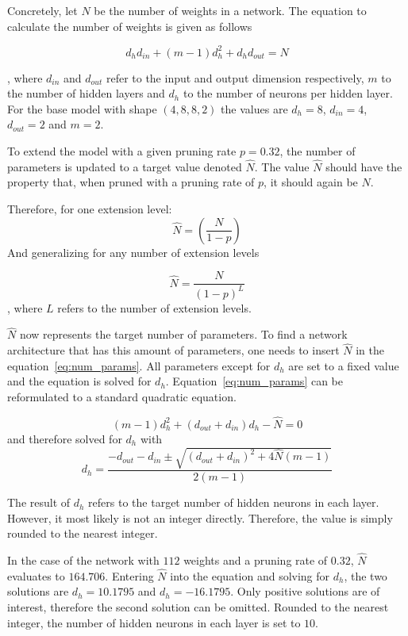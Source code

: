 Concretely, let $N$ be the number of weights in a network.
The equation to calculate the number of weights is given as follows

\begin{equation} \label{eq:num_params}
    d_h d_{in}+(m-1)d_h^2 + d_h d_{out} = N
\end{equation}

, where $d_{in}$ and $d_{out}$ refer to the input and output dimension respectively, $m$ to the number of hidden layers and
$d_h$ to the number of neurons per hidden layer.
For the base model with shape $(4, 8, 8, 2)$ the values are $d_h=8$, 
$d_{in}=4$, $d_{out}=2$ and $m=2$.
 
To extend the model with a given pruning rate $p=0.32$, the number of parameters is updated to a target value denoted $\hat N$.
The value $\hat N$ should have the property that, when pruned with a pruning rate of $p$, it should again be $N$.

Therefore, for one extension level:
\[
\hat N = {(\frac{N}{1-p})}
\]
And generalizing for any number of extension levels

\[
\hat N = {\frac{N}{{(1-p)}^L}}
\]
, where $L$ refers to the number of extension levels.

$\hat N$ now represents the target number of parameters. 
To find a network architecture that has this amount of parameters, one needs to insert $\hat N$ in the equation~\ref{eq:num_params}.
All parameters except for $d_h$ are set to a fixed value and the equation is solved for $d_h$.
Equation~\ref{eq:num_params} can be reformulated to a standard quadratic equation.

\[
    (m-1)d_h^2 + (d_{out} + d_{in}) d_h - \hat N = 0
\]
and therefore solved for $d_h$ with 
\[
    d_h = \frac{
        - d_{out} - d_{in} \pm \sqrt{  {(d_{out} + d_{in})}^2 + 4 \hat N (m-1) } 
    }{
        2(m-1)
    }
\]

The result of $d_h$ refers to the target number of hidden neurons in each layer.
However, it most likely is not an integer directly.
Therefore, the value is simply rounded to the nearest integer.

In the case of the network with $112$ weights and a pruning rate of $0.32$, $\hat N$ evaluates to $164.706$.
Entering $\hat N$ into the equation and solving for $d_h$, the two solutions are $d_h=10.1795$ and $d_h=-16.1795$.
Only positive solutions are of interest, therefore the second solution can be omitted.
Rounded to the nearest integer, the number of hidden neurons in each layer is set to $10$.

